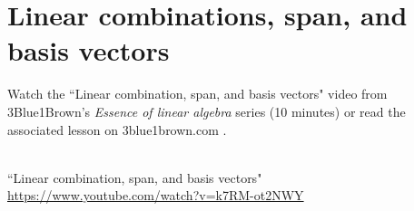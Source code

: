 \section{Linear combinations, span, and basis vectors}

Watch the ``Linear combination, span, and basis vectors" video from
3Blue1Brown's \textit{Essence of linear algebra} series (10 minutes) or read the
associated lesson on 3blue1brown.com
\cite{bib:3b1b_linalg_linear_combinations}.
\begin{bookfigure}
   \\
  \tiny
  ``Linear combination, span, and basis vectors" \\
  \url{https://www.youtube.com/watch?v=k7RM-ot2NWY}
\end{bookfigure}
